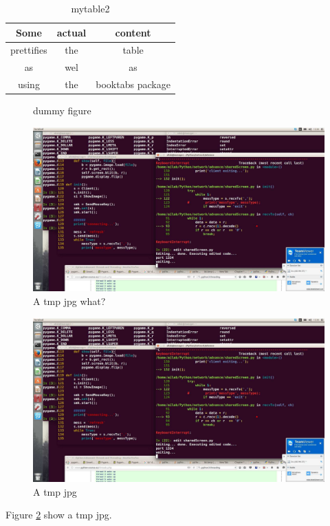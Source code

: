 \documentclass{article}
\begin{document}
\begin{table}[h!]
	\centering
	\caption{mytable2}
	\begin{tabular}{ccc}
		\toprule
		Some &actual&content\\
		\midrule
		prettifies &the& table\\
		as &wel &as\\
		using &the& booktabs package\\
		\bottomrule
	\end{tabular}
\end{table}


\newpage
\tableofcontents

\newpage


\begin{figure}
	\caption{dummy figure}
\end{figure}



\begin{figure}[h!]
	\includegraphics[width=\linewidth]{tmp.jpg}
	\caption{A tmp jpg what?}
	\label{fig:tmpa}
\end{figure}
\begin{figure}
	\includegraphics[width=\linewidth]{tmp.jpg}
	\caption{A tmp jpg}
	\label{fig:tmp}
\end{figure}
Figure \ref{fig:tmp} show a tmp jpg.
\end{document}
